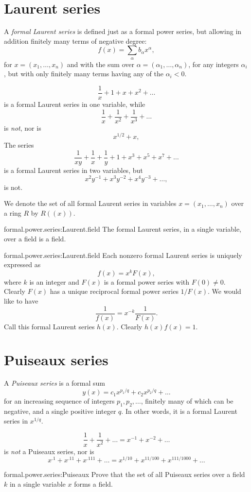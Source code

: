 \section{Laurent series}
A \emph{formal Laurent series} is defined just as a formal power series, but allowing in addition finitely many terms of negative degree:
\[
f(x)=\sum_{\alpha} b_{\alpha}x^{\alpha},
\]
for \(x=(x_1,\dots,x_n)\) and with the sum over \(\alpha=(\alpha_1,\dots,\alpha_n)\), for any integers \(\alpha_i\), but with only finitely many terms having any of the \(\alpha_i<0\).
\begin{example}
\[
\frac{1}{x}+1+x+x^2+\dots
\]
is a formal Laurent series in one variable, while
\[
\frac{1}{x}+\frac{1}{x^2}+\frac{1}{x^3}+\dots
\]
is \emph{not}, nor is
\[
x^{1/2}+x,
\]
The series
\[
\frac{1}{xy}+\frac{1}{x}+\frac{1}{y}+1+x^3+x^5+x^7+\dots
\]
is a formal Laurent series in two variables, but
\[
x^2y^{-1}+x^3y^{-2}+x^4y^{-3}+\dots,
\]
is not.
\end{example}
We denote the set of all formal Laurent series in variables \(x=(x_1,\dots,x_n)\) over a ring \(R\) by \(R((x))\).
\begin{problem}{formal.power.series:Laurent.field}
The formal Laurent series, in a single variable, over a field is a field.
\end{problem}
\begin{answer}{formal.power.series:Laurent.field}
Each nonzero formal Laurent series is uniquely expressed as 
\[
f(x)=x^k F(x),
\]
where \(k\) is an integer and \(F(x)\) is a formal power series with \(F(0)\ne 0\).
Clearly \(F(x)\) has a unique reciprocal formal power series \(1/F(x)\).
We would like to have
\[
\frac{1}{f(x)}=x^{-k}\frac{1}{F(x)}.
\]
Call this formal Laurent series \(h(x)\).
Clearly \(h(x)f(x)=1\).
\end{answer}
\section{Puiseaux series}
A \emph{Puiseaux series} is a formal sum
\[
y(x)=c_1 x^{p_1/q}+c_2x^{p_2/q}+\dots
\]
for an increasing sequence of integers \(p_1,p_2,\dots\), finitely many of which can be negative, and a single positive integer \(q\).
In other words, it is a formal Laurent series in \(x^{1/q}\).
\begin{example}
\[
\frac{1}{x}+\frac{1}{x^2}+\dots=x^{-1}+x^{-2}+\dots
\]
is \emph{not} a Puiseaux series, nor is
\[
x^{.1}+x^{.11}+x^{.111}+\dots=x^{1/10}+x^{11/100}+x^{111/1000}+\dots
\]
\end{example}
\begin{problem}{formal.power.series:Puiseaux}
Prove that the set of all Puiseaux series over a field \(k\) in a single variable \(x\) forms a field.
\end{problem}

